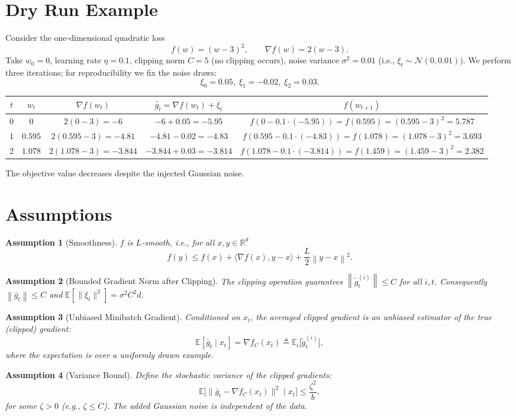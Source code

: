 \documentclass{article}
\newtheorem{assumption}{Assumption}
\newcommand{\EE}{\mathbb{E}}
\newcommand{\RR}{\mathbb{R}}
\newcommand{\norm}[1]{\left\|#1\right\|}
\newcommand{\grad}{\nabla}
\begin{document}
\section*{Dry Run Example}
Consider the one‑dimensional quadratic loss 
\[
f(w)=(w-3)^{2},\qquad \grad f(w)=2(w-3).
\]
Take $w_{0}=0$, learning rate $\eta=0.1$, clipping norm $C=5$ (no clipping occurs), noise variance $\sigma^{2}=0.01$ (i.e., $\xi_{t}\sim \mathcal N(0,0.01)$).  
We perform three iterations; for reproducibility we fix the noise draws:
\[
\xi_{0}=0.05,\;\xi_{1}=-0.02,\;\xi_{2}=0.03.
\]

\begin{center}
\begin{tabular}{c|c|c|c|c}
$t$ & $w_{t}$ & $\grad f(w_{t})$ & $\hat g_{t}= \grad f(w_{t})+\xi_{t}$ & $f(w_{t+1})$\\ \hline
0 & $0$ & $2(0-3)=-6$ & $-6+0.05=-5.95$ & $f(0-0.1\cdot(-5.95))=f(0.595)= (0.595-3)^{2}=5.787$\\[4pt]
1 & $0.595$ & $2(0.595-3)=-4.81$ & $-4.81-0.02=-4.83$ & $f(0.595-0.1\cdot(-4.83))=f(1.078)= (1.078-3)^{2}=3.693$\\[4pt]
2 & $1.078$ & $2(1.078-3)=-3.844$ & $-3.844+0.03=-3.814$ & $f(1.078-0.1\cdot(-3.814))=f(1.459)= (1.459-3)^{2}=2.382$\\
\end{tabular}
\end{center}
The objective value decreases despite the injected Gaussian noise.

\newpage
\section*{Assumptions}
\begin{assumption}[Smoothness]\label{ass:smooth}
$f$ is $L$‑smooth, i.e., for all $x,y\in\RR^{d}$
\[
f(y)\le f(x)+\langle \grad f(x),y-x\rangle +\frac{L}{2}\norm{y-x}^{2}.
\]
\end{assumption}
\begin{assumption}[Bounded Gradient Norm after Clipping]\label{ass:clip}
The clipping operation guarantees $\norm{\tilde g_{t}^{(i)}}\le C$ for all $i,t$.
Consequently $\norm{\bar g_{t}}\le C$ and $\EE[\|\xi_{t}\|^{2}]=\sigma^{2}C^{2}d$.
\end{assumption}
\begin{assumption}[Unbiased Minibatch Gradient]\label{ass:unbiased}
Conditioned on $x_{t}$, the averaged clipped gradient is an unbiased estimator of the true (clipped) gradient:
\[
\EE[\bar g_{t}\mid x_{t}] = \grad f_{C}(x_{t})\triangleq \EE_{i}\bigl[\tilde g_{t}^{(i)}\bigr],
\]
where the expectation is over a uniformly drawn example.
\end{assumption}
\begin{assumption}[Variance Bound]\label{ass:var}
Define the stochastic variance of the clipped gradients:
\[
\EE\bigl[\|\bar g_{t}-\grad f_{C}(x_{t})\|^{2}\mid x_{t}\bigr]\le\frac{\zeta^{2}}{b},
\]
for some $\zeta>0$ (e.g., $\zeta\le C$). The added Gaussian noise is independent of the data.
\end{assumption}
\end{document}
